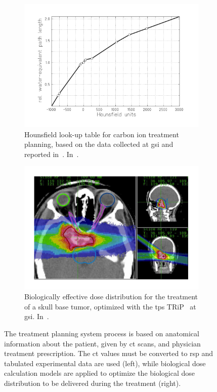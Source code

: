  \begin{figure}[!htbp]
 \begin{subfigure}[t]{.49\textwidth}
\centering
\includegraphics[width=0.92\linewidth]{03_GraphicFiles/chapter1_Introduction/HounsfieldUnits.pdf}	
\caption{Hounsfield look-up table for carbon ion treatment planning, based on the data collected at \gls{gsi} and reported in~\cite{Jakel2001}. In~\cite{Rietzel2007}.}
\label{chap1::fig::HU}
\end{subfigure}
 \begin{subfigure}[t]{.49\textwidth}
\centering
\includegraphics[width=0.92\linewidth]{03_GraphicFiles/chapter1_Introduction/TRIPplan.pdf}
\caption{Biologically effective dose distribution for the treatment of a skull base tumor, optimized with the \gls{tps} TRiP~\parencite{Kramer2000} at \gls{gsi}. In~\cite{Schardt2010}.}
\label{chap1::fig::}
\end{subfigure}
\caption{The treatment planning system process is based on anatomical information about the patient, given by \gls{ct} scans, and physician treatment prescription. The \gls{ct} values must be converted to \gls{rsp} and tabulated experimental data are used (left), while biological dose calculation models are applied to optimize the biological dose distribution to be delivered during the treatment (right).}
\label{chap1::fig::TPS}
\end{figure}           


